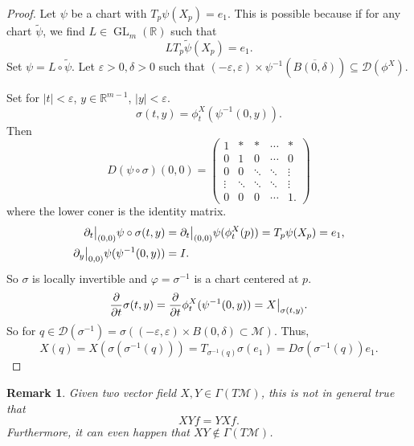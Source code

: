 \documentclass[8pt]{article}
\newtheorem{remark}{Remark}[section]
\DeclareMathOperator{\GL}{GL}
\newcommand{\R}[0]{\mathbb{R}}
\newcommand{\M}[0]{\mathcal{M}}
\newcommand{\pd}[2]{{\frac {\partial #1} {\partial #2}}}
\begin{document}
\begin{proof}
  Let $\psi$ be a chart with $T_p\psi(X_p) = e_1$. This is possible because if for any chart $\tilde{\psi}$, we find $L\in\GL_m(\R)$ such that 
  \begin{equation*}
    LT_p\tilde{\psi}(X_p) = e_1.
  \end{equation*}
  Set $\psi = L\circ\tilde{\psi}$. Let $\varepsilon>0,\delta>0$ such that $(-\varepsilon,\varepsilon)\times \psi^{-1}(\overline{B(0,\delta)})\subseteq\mathcal{D}(\phi^X)$.
  \par Set for $\vert t\vert <\varepsilon$, $y\in\R^{m-1}$, $\vert y\vert <\varepsilon$. 
  \begin{equation*}
    \sigma(t,y) = \phi_t^X(\psi^{-1}(0,y)).
  \end{equation*} 
  Then 
  \begin{equation*}
    D(\psi\circ\sigma)( 0,0) = \begin{pmatrix}
      1 & \ast & \ast & \cdots & \ast\\
      0 & 1 & 0 & \cdots& 0\\
      0 & 0 & \ddots & \ddots & \vdots \\
      \vdots & \ddots & \ddots & \ddots & \vdots\\
      0 & 0 & 0& \cdots & 1.
    \end{pmatrix}
  \end{equation*}
  where the lower coner is the identity matrix.
  \begin{align*}
    \partial_t\big{|}_{(0,0)}\psi\circ\sigma(t,y) & = \partial_t\big{|}_{(0,0)}\psi(\phi_t^X(p)) = T_p\psi(X_p) = e_1,\\
    \partial_y\big{|}_{0,0)}\psi(\psi^{-1}(0,y))&=I.
  \end{align*}
  So $\sigma$ is locally invertible and $\varphi=\sigma^{-1}$ is a chart centered at $p$. 
  \begin{equation*}
    \pd{}{t}\sigma(t,y) = \pd{}{t}\phi^X_t(\psi^{-1}(0,y)) = X\big{|}_{\sigma(t,y)}.
  \end{equation*}
  So for $q\in\mathcal{D}(\sigma^{-1}) = \sigma((-\varepsilon,\varepsilon)\times B(0,\delta)\subset\M)$. Thus,
  \begin{equation*}
    X(q) = X(\sigma(\sigma^{-1}(q))) = T_{\sigma^{-1}(q)}\sigma(e_1) = D\sigma(\sigma^{-1}(q))e_1.
  \end{equation*}
\end{proof}

\begin{remark}
  Given two vector field $X,Y\in\Gamma(T\M)$, this is not in general true that 
  \begin{equation*}
    XY f = YX f.
  \end{equation*}
  Furthermore, it can even happen that $XY\not\in\Gamma(T\M)$.
\end{remark}
\end{document}
